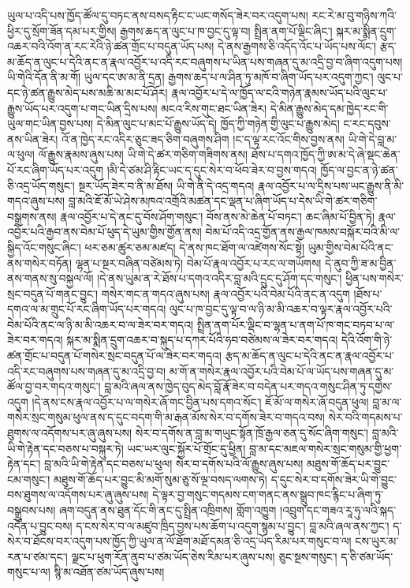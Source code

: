 \documentclass{article}
\begin{document}
ཡུལ་པ་འདི་པས་ཁྱོད་ཚོལ་དུ་བཏང་ནས་བསད་རྟིང་ང་ཡང་གསོད་ཟེར་བར་འདུག་པས། རང་རེ་མ་བུ་གཉིས་ཀའི་ཕྱིར་དུ་སྲོག་ཟོན་དམ་པར་གྱིས། རྒྱགས་ཆད་ན་ལུང་པ་ཁ་བྱང་དུ་ལྟ་བ། སྤྲིན་ནག་པོ་ལྡིང་ཞིང་། སྐར་མ་སྨིན་དྲུག་འཆར་བའི་འོག་ན་རང་རེའི་ཉེ་ཚན་གྲོང་པ་བདུན་ཡོད་པས། དེ་ནས་རྒྱགས་ཅི་འདོད་འོང་པ་ཡོད་པས་ལོང་། རྩད་མ་ཆོད་ན་ལུང་པ་དེའི་ནང་ན་རྣལ་འབྱོར་པ་འདི་རང་བཞུགས་པ་ཡིན་པས་གཞན་དུ་མ་འདྲི་བྱ་བ་ཞིག་འདུག་པས། ཡི་གེའི་དོན་ནི་མ་གོ། ཡུལ་དང་ཨ་མ་ནི་དྲན། རྒྱགས་ཆད་པ་ལ་ཤིན་ཏུ་མཁོ་བ་ཞིག་ཡོད་པར་འདུག་ཀྱང་། ལུང་པ་དང་ཉེ་ཚན་རྒྱུས་མེད་པས་མཆི་མ་མང་པོ་ཤོར། རྣལ་འབྱོར་པ་དེ་ལ་ཁྱོད་ལ་ངའི་གཉེན་རྣམས་ཡོད་པའི་ལུང་པ་རྒྱུས་ཡོད་པར་འདུག་པ་གང་ཡིན་དྲིས་པས། མངའ་རིས་གུང་ཐང་ཡིན་ཟེར། དེ་མིན་རྒྱུས་མེད་དམ་ཁྱེད་རང་གི་ཡུལ་གང་ཡིན་བྱས་པས། དེ་མིན་ལུང་པ་མང་པོ་རྒྱུས་ཡོད་དེ། ཁྱོད་ཀྱི་གཉེན་གྱི་ལུང་པ་རྒྱུས་མེད། ང་རང་དབུས་ནས་ཡིན་ཟེར། འོ་ན་ཁྱེད་རང་འདིར་ཅུང་ཟད་ཅིག་བཞུགས་ཤིག །ང་ད་ལྟ་རང་འོང་གིས་བྱས་ནས། ཡི་གེ་དེ་བླ་མ་ལ་ཕུལ། ལོ་རྒྱུས་རྣམས་ཞུས་པས། ཡི་གེ་དེ་ཚར་གཅིག་གཟིགས་ནས། ཐོས་པ་དགའ་ཁྱོད་ཀྱི་ཨ་མ་དེ་ཞེ་སྡང་ཆེན་པོ་རང་ཞིག་ཡོད་པར་འདུག །མི་དེ་ཙམ་ཤི་རྟིང་ཡང་ད་དུང་སེར་བ་ཕོབ་ཟེར་བ་བྱས་གདའ། ཁྱོད་ལ་བྱང་ན་ཉེ་ཚན་ཅི་འདྲ་ཡོད་གསུང་། སྔར་ཡོད་ཟེར་བ་ནི་མ་ཐོས། ཡི་གེ་ནི་དེ་འདྲ་གདའ། རྣལ་འབྱོར་པ་ལ་དྲིས་པས་ཡང་རྒྱུས་ནི་མི་གདའ་ཞུས་པས། བླ་མའི་ཇོ་མོ་ཡེ་ཤེས་མཁའ་འགྲོའི་མཚན་དང་ལྡན་པ་ཞིག་ཡོད་པ་དེས་ཡི་གེ་ཚར་གཅིག་བསྒྲགས་ནས། རྣལ་འབྱོར་པ་དེ་ནང་དུ་བོས་ཤོག་གསུང་། བོས་ནས་མེ་ཆེན་པོ་བཏང་། ཆང་ཞིམ་པོ་བྱིན་ཏེ། རྣལ་འབྱོར་པའི་རྒྱབ་ནས་བེམ་པོ་ཕུད་དེ་ཡུམ་གྱིས་གྱོན་ནས། བེམ་པོ་འདི་འདྲ་གྱོན་ནས་རྒྱལ་ཁམས་བསྐོར་བའི་མི་ལ་སྐྱིད་འོང་གསུང་ཞིང་། ཕར་ཅམ་ཚུར་ཅམ་མཛད། དེ་ནས་ཁང་ཐོག་ལ་འཛེགས་སོང་སྟེ། ཡུམ་གྱིས་བེམ་པོའི་ནང་ནས་གསེར་བཏོན། ལྷན་པ་སྔར་བཞིན་བཙེམས་ཏེ། བེམ་པོ་རྣལ་འབྱོར་པ་རང་ལ་གཡོགས། དེ་ནུབ་ཀྱི་ཟ་མ་བྱིན་ནས་གནས་སུ་བསྐྱལ་ལོ། །དེ་ནས་ཡུམ་ན་རེ་ཐོས་པ་དགའ་འདིར་བླ་མའི་དྲུང་དུ་ཤོག་དང་གསུང་། ཕྱིན་པས་གསེར་སྲང་བདུན་པོ་གནང་བྱུང་། གསེར་གང་ན་གདའ་ཞུས་པས། རྣལ་འབྱོར་པའི་བེམ་པོའི་ནང་ན་འདུག །ཐོས་པ་དགའ་ལ་མ་གྲུང་པོ་རང་ཞིག་ཡོད་པར་གདའ། ལུང་པ་ཁ་བྱང་དུ་ལྟ་བ་ལ་ཉི་མ་མི་འཆར་བ་ལྟར་རྣལ་འབྱོར་པའི་བེམ་པོའི་ནང་ལ་ཉི་མ་མི་འཆར་བ་ལ་ཟེར་བར་གདའ། སྤྲིན་ནག་པོར་ལྡིང་བ་ལྷན་པ་ནག་པོ་ཁ་གང་བཏབ་པ་ལ་ཟེར་བར་གདའ། སྐར་མ་སྨིན་དྲུག་འཆར་བ་སྐུད་པ་དཀར་པོའི་ཧབ་བཙེམས་ལ་ཟེར་བར་གདའ། དེའི་འོག་གི་ཉེ་ཚན་གྲོང་པ་བདུན་པོ་གསེར་སྲང་བདུན་པོ་ལ་ཟེར་བར་གདའ། རྩད་མ་ཆོད་ན་ལུང་པ་དེའི་ནང་ན་རྣལ་འབྱོར་པ་འདི་རང་བཞུགས་པས་གཞན་དུ་མ་འདྲི་བྱ་བ། མ་གོ་ན་གསེར་རྣལ་འབྱོར་པའི་བེམ་པོ་ལ་ཡོད་པས་གཞན་དུ་མ་ཚོལ་བྱ་བར་གདའ་གསུང་། བླ་མའི་ཞལ་ནས་ཁྱེད་བུད་མེད་བློ་རྣོ་ཟེར་བ་བདེན་པར་གདའ་གསུང་ཤིན་ཏུ་དགྱེས་འདུག །དེ་ནས་ངས་རྣལ་འབྱོར་པ་ལ་གསེར་ཞོ་གང་བྱིན་པས་དགའ་སོང་། ཇོ་མོ་ལ་གསེར་ཞོ་བདུན་ཕུལ། བླ་མ་ལ་གསེར་སྲང་གསུམ་ཕུལ་ནས་ད་དུང་བདག་གི་མ་རྒན་མོས་སེར་བ་དགོས་ཟེར་བ་གདའ་བས། སེར་བའི་གདམས་པ་ཐུགས་ལ་འདོགས་པར་ཞུ་ཞུས་པས། སེར་བ་དགོས་ན་བླ་མ་གཡུང་སྟོན་ཁྲོ་རྒྱལ་ཅན་དུ་སོང་ཞིག་གསུང་། བླ་མའི་ཡི་གེ་རྟེན་དང་བཅས་པ་བསྐུར་ཏེ། ཡང་ཡར་ལུང་སྐྱོར་པོ་གྲོང་དུ་ཕྱིན། བླ་མ་དང་མཇལ་གསེར་སྲང་གསུམ་གྱི་ཕྱག་རྟེན་དང་། བླ་མའི་ཡི་གེ་རྟེན་དང་བཅས་པ་ཕུལ། སེར་བ་དགོས་པའི་ལོ་རྒྱུས་ཞུས་པས། མཐུས་གོ་ཆོད་པར་བྱུང་ངམ་གསུང་། མཐུས་གོ་ཆོད་པར་བྱུང་མི་མགོ་སུམ་ཅུ་སོ་ལྔ་བསད་ལགས་ཏེ། ད་དུང་སེར་བ་དགོས་ཟེར་ཡི་གེ་བྱུང་བས་ཐུགས་ལ་འདོགས་པར་ཞུ་ཞུས་པས། དེ་ལྟར་བྱ་གསུང་གདམས་ངག་གནང་ནས་སྒྲུབ་ཁང་རྙིང་པ་ཞིག་ཏུ་བསྒྲུབས་པས། ཞག་བདུན་ནས་ཐུན་དོང་གི་ནང་དུ་སྤྲིན་འཁྲིགས། གློག་འཁྱུག །འབྲུག་དང་གཟའ་རཱ་ཧུ་ལའི་སྐད་འདོན་པ་བྱུང་བས། ད་ངས་སེར་བ་ལ་མཛུབ་ཁྲིད་བྱས་པས་ཆོག་པ་འདུག་སྙམ་པ་བྱུང་། བླ་མའི་ཞལ་ནས་ཀྱང་། ད་སེར་བ་ཐོངས་བར་འདུག་པས་ཁྱོད་ཀྱི་ཡུལ་ན་ལོ་ཐོག་མཐོ་དམན་ཅི་འདྲ་ཡོད་རིམ་པར་གསུང་བ་ལ། ངས་ཡུར་མ་རན་པ་ཙམ་དང་། ལྗང་པ་ཕུག་རོན་ནུབ་པ་ཙམ་ཡོད་ཅེས་རིམ་པར་ཞུས་པས། ཅུང་སྔས་གསུང་། ད་ཅི་ཙམ་ཡོད་གསུང་པ་ལ། སྙི་མ་འཐོན་ཙམ་ཡོད་ཞུས་པས། 
\end{document}
